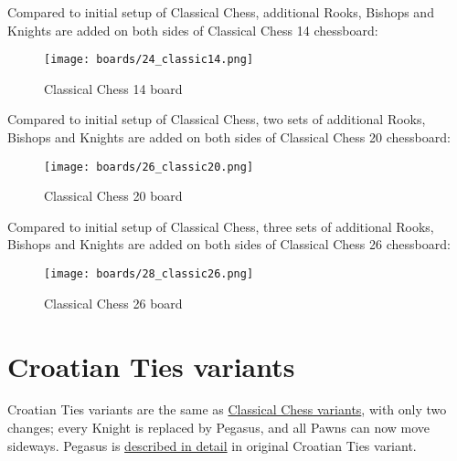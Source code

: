 Compared to initial setup of Classical Chess, additional Rooks, Bishops and Knights
are added on both sides of Classical Chess 14 chessboard:

\noindent
\begin{figure}[h]
\texttt{[image: boards/24\_classic14.png]}
\caption{Classical Chess 14 board}
\label{fig:24_classic14}
\end{figure}

\vfill{}

\clearpage %

Compared to initial setup of Classical Chess, two sets of additional Rooks, Bishops
and Knights are added on both sides of Classical Chess 20 chessboard:

\noindent
\begin{figure}[h]
\texttt{[image: boards/26\_classic20.png]}
\caption{Classical Chess 20 board}
\label{fig:26_classic20}
\end{figure}

\vfill{}

\clearpage %

Compared to initial setup of Classical Chess, three sets of additional Rooks, Bishops
and Knights are added on both sides of Classical Chess 26 chessboard:

\noindent
\begin{figure}[h]
\texttt{[image: boards/28\_classic26.png]}
\caption{Classical Chess 26 board}
\label{fig:28_classic26}
\end{figure}

\vfill{}

\clearpage %

\section*{Croatian Ties variants}
\label{sec:Simple variants/Croatian Ties variants}

Croatian Ties variants are the same as
\hyperref[sec:Simple variants/Classical Chess variants]{Classical Chess variants},
with only two changes; every Knight is replaced by Pegasus, and all Pawns can now
move sideways. Pegasus is \hyperref[sec:Croatian Ties/Pegasus]{described in detail}
in original Croatian Ties variant.

